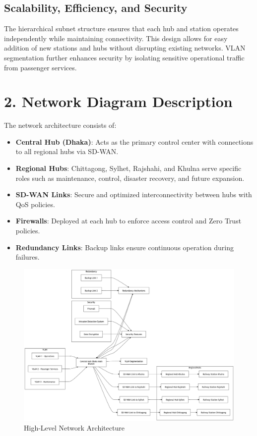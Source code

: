 \documentclass[12pt]{article}
\begin{document}
\subsection*{Scalability, Efficiency, and Security}
The hierarchical subnet structure ensures that each hub and station operates independently while maintaining connectivity. This design allows for easy addition of new stations and hubs without disrupting existing networks. VLAN segmentation further enhances security by isolating sensitive operational traffic from passenger services.

\section*{2. Network Diagram Description}

The network architecture consists of:
\begin{itemize}
    \item \textbf{Central Hub (Dhaka)}: Acts as the primary control center with connections to all regional hubs via SD-WAN.
    \item \textbf{Regional Hubs}: Chittagong, Sylhet, Rajshahi, and Khulna serve specific roles such as maintenance, control, disaster recovery, and future expansion.
    \item \textbf{SD-WAN Links}: Secure and optimized interconnectivity between hubs with QoS policies.
    \item \textbf{Firewalls}: Deployed at each hub to enforce access control and Zero Trust policies.
    \item \textbf{Redundancy Links}: Backup links ensure continuous operation during failures.
\end{itemize}

\begin{figure}[h]
    \centering
    \includegraphics[width=1.0\textwidth]{./net3.png} 
    \caption{High-Level Network Architecture}
\end{figure}
\end{document}
